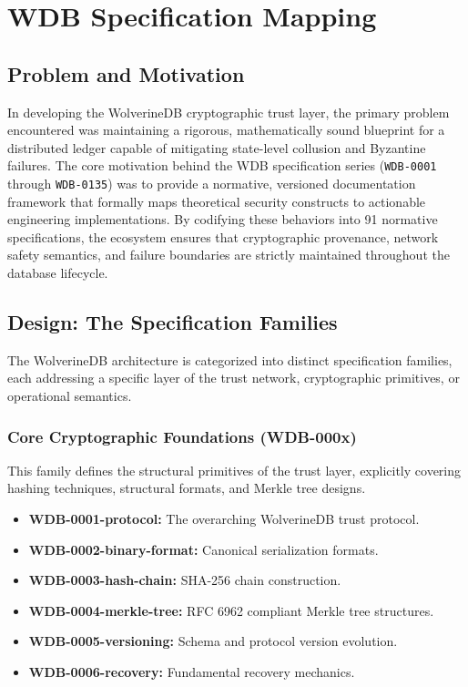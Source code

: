 \chapter{WDB Specification Mapping}
\label{app:wdb-specifications}

\section{Problem and Motivation}

In developing the WolverineDB cryptographic trust layer, the primary problem encountered was maintaining a rigorous, mathematically sound blueprint for a distributed ledger capable of mitigating state-level collusion and Byzantine failures. The core motivation behind the WDB specification series (\texttt{WDB-0001} through \texttt{WDB-0135}) was to provide a normative, versioned documentation framework that formally maps theoretical security constructs to actionable engineering implementations. By codifying these behaviors into 91 normative specifications, the ecosystem ensures that cryptographic provenance, network safety semantics, and failure boundaries are strictly maintained throughout the database lifecycle.

\section{Design: The Specification Families}

The WolverineDB architecture is categorized into distinct specification families, each addressing a specific layer of the trust network, cryptographic primitives, or operational semantics.

\subsection{Core Cryptographic Foundations (WDB-000x)}
This family defines the structural primitives of the trust layer, explicitly covering hashing techniques, structural formats, and Merkle tree designs.
\begin{itemize}
    \item \textbf{WDB-0001-protocol:} The overarching WolverineDB trust protocol.
    \item \textbf{WDB-0002-binary-format:} Canonical serialization formats.
    \item \textbf{WDB-0003-hash-chain:} SHA-256 chain construction.
    \item \textbf{WDB-0004-merkle-tree:} RFC 6962 compliant Merkle tree structures.
    \item \textbf{WDB-0005-versioning:} Schema and protocol version evolution.
    \item \textbf{WDB-0006-recovery:} Fundamental recovery mechanics.
\end{itemize}

